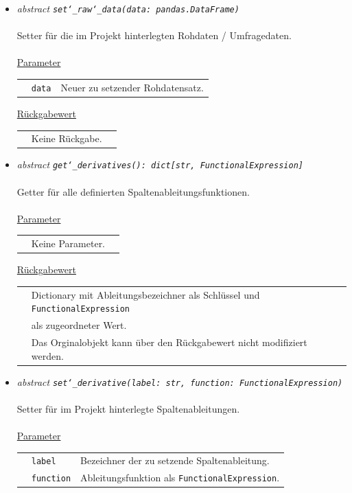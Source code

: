 \documentclass{article}
\begin{document}
\begin{itemize}
\item \textit{\flqq{}abstract\frqq} \texttt{\textit{set\char`_raw\char`_data(data: pandas.DataFrame)}}\\\\
Setter für die im Projekt hinterlegten Rohdaten / Umfragedaten.
\\\\
\underline{Parameter}\\
\begin{tabular}{lll}
 & \texttt{data} & Neuer zu setzender Rohdatensatz.\\
\end{tabular}

\underline{Rückgabewert}\\
\begin{tabular}{lll}
 & Keine Rückgabe.\\
\end{tabular}


\item \textit{\flqq{}abstract\frqq} \texttt{\textit{get\char`_derivatives(): dict[str, FunctionalExpression]}}\\\\
Getter für alle definierten Spaltenableitungsfunktionen.
\\\\
\underline{Parameter}\\
\begin{tabular}{lll}
 & Keine Parameter.\\
\end{tabular}

\underline{Rückgabewert}\\
\begin{tabular}{lll}
 & Dictionary mit Ableitungsbezeichner als Schlüssel und \texttt{FunctionalExpression}\\
 & als zugeordneter Wert.\\
 & Das Orginalobjekt kann über den Rückgabewert nicht modifiziert werden.\\
\end{tabular}


\item \textit{\flqq{}abstract\frqq} \texttt{\textit{set\char`_derivative(label: str, function: FunctionalExpression)}}\\\\
Setter für im Projekt hinterlegte Spaltenableitungen.
\\\\
\underline{Parameter}\\
\begin{tabular}{lll}
 & \texttt{label} & Bezeichner der zu setzende Spaltenableitung.\\
 & \texttt{function} & Ableitungsfunktion als \texttt{FunctionalExpression}.\\
\end{tabular}


\end{itemize}
\end{document}
